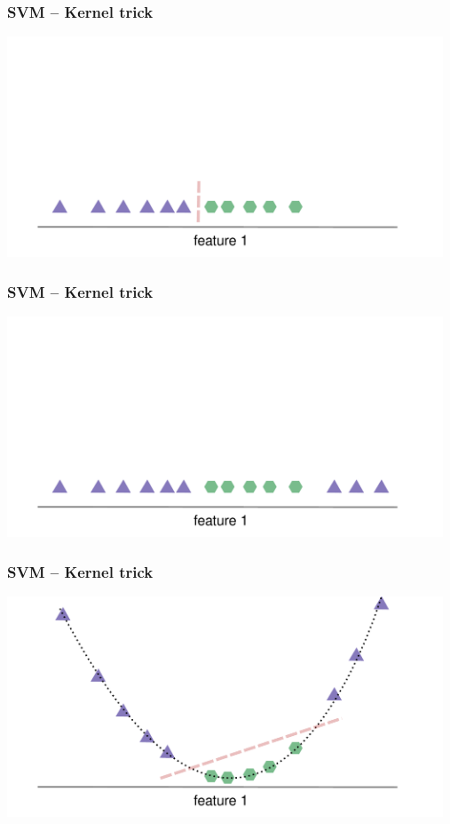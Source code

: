 \documentclass[aspectratio=169]{beamer}
\begin{document}
\begin{frame}
  \frametitle{SVM -- Kernel trick}
  \begin{center}
    \includegraphics[width=13.0cm]{images/svm_kernel_trick_1.pdf}
  \end{center}
\end{frame}

\begin{frame}
  \frametitle{SVM -- Kernel trick}
  \begin{center}
    \includegraphics[width=13.0cm]{images/svm_kernel_trick_2.pdf}
  \end{center}
\end{frame}

\begin{frame}
  \frametitle{SVM -- Kernel trick}
  \begin{center}
    \includegraphics[width=13.0cm]{images/svm_kernel_trick_3.pdf}
  \end{center}
\end{frame}
\end{document}
